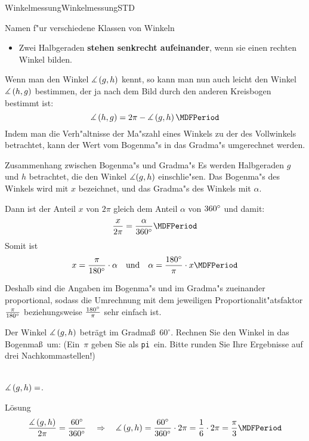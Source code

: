 \begin{MXContent}{Winkelmessung}{Winkelmessung}{STD}
\begin{MXInfo}{Namen f"ur verschiedene Klassen von Winkeln}
\begin{itemize}
 \item Zwei Halbgeraden \textbf{stehen senkrecht aufeinander}, wenn sie einen rechten Winkel bilden.
\end{itemize}
\end{MXInfo}



Wenn man den Winkel $\measuredangle \left( g, h \right)$ kennt, so kann man 
nun auch leicht den Winkel $\measuredangle \left( h, g \right)$ bestimmen, 
der ja nach dem Bild  durch den anderen Kreisbogen 
bestimmt ist:
\[
   \Mmeasuredangle \left( h, g \right)
 = 2 \pi - \Mmeasuredangle \left( g, h \right) \MDFPeriod
\]
Indem man die Verh"altnisse der Ma"szahl eines Winkels zu der des Vollwinkels
betrachtet, kann der Wert vom Bogenma"s in das Gradma"s umgerechnet werden.

\begin{MXInfo}{Zusammenhang zwischen Bogenma"s und Gradma"s}
Es werden Halbgeraden $g$ und $h$ betrachtet, die den Winkel 
$\measuredangle(g,h)$ einschlie"sen. Das Bogenma"s des Winkels wird mit $x$ 
bezeichnet, und das Gradma"s des Winkels mit $\alpha$. 

Dann ist der Anteil $x$ von $2\pi$ gleich dem Anteil $\alpha$ von 
$360{}^{\circ}$ und damit: 
\[
   \frac{x}{2\pi} = \frac{\alpha}{360\MGrad} \MDFPeriod
\]
Somit ist 
\[
x = \frac{\pi}{180\MGrad} \cdot \alpha %
\quad\text{und}\quad
\alpha = \frac{180\MGrad}{\pi} \cdot x \MDFPeriod
\]
\end{MXInfo}
Deshalb sind die Angaben im Bogenma"s und im Gradma"s zueinander proportional,
sodass die Umrechnung mit dem jeweiligen Proportionalit"atsfaktor 
$\frac{\pi}{180{}^{\circ}}$ beziehungsweise $\frac{180{}^{\circ}}{\pi}$ 
sehr einfach
ist.
\begin{MExercise}
Der Winkel $\measuredangle\left(g, h\right)$ betr\"agt im Gradma\ss\ $60^\circ$. Rechnen Sie den Winkel in das Bogenma\ss\ um:
\ifttm%
(Ein~$\pi$ geben Sie als \glqq\texttt{pi}\grqq\ ein. Bitte runden Sie Ihre Ergebnisse auf drei Nachkommastellen!)
\fi

\ \\
$\measuredangle\left(g, h\right)=$.
\ \\
\begin{MHint}{L\"osung}
\[
\frac{\Mmeasuredangle\left(g, h\right)}{2\pi} %
= \frac{60\MGrad}{360\MGrad} %
\quad\Rightarrow\quad
 \Mmeasuredangle\left(g, h\right) %
= \frac{60\MGrad}{360\MGrad}\cdot 2\pi %
= \frac{1}{6}\cdot 2\pi=\frac{\pi}{3}\MDFPeriod 
\]
\end{MHint}


\end{MExercise}
\end{MXContent}
